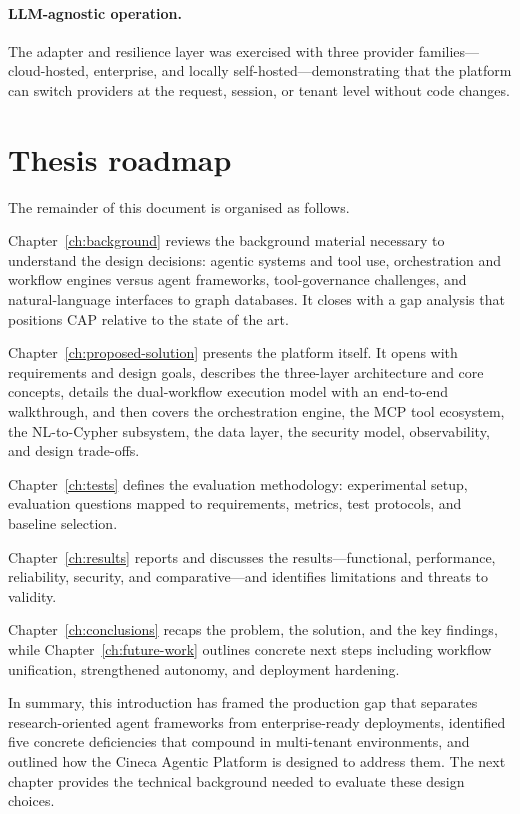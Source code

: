\documentclass[a4paper]{sapthesis}
\begin{document}
\paragraph{LLM-agnostic operation.}
The adapter and resilience layer was exercised with three provider
families---cloud-hosted, enterprise, and locally self-hosted---demonstrating
that the platform can switch providers at the request, session, or tenant
level without code changes.

\section{Thesis roadmap}
\label{sec:thesis-roadmap}

The remainder of this document is organised as follows.

Chapter~\ref{ch:background} reviews the background material necessary to
understand the design decisions: agentic systems and tool use, orchestration
and workflow engines versus agent frameworks, tool-governance challenges,
and natural-language interfaces to graph databases.  It closes with a gap
analysis that positions CAP relative to the state of the art.

Chapter~\ref{ch:proposed-solution} presents the platform itself.  It opens
with requirements and design goals, describes the three-layer architecture
and core concepts, details the dual-workflow execution model with an
end-to-end walkthrough, and then covers the orchestration engine, the MCP
tool ecosystem, the NL-to-Cypher subsystem, the data layer, the security
model, observability, and design trade-offs.

Chapter~\ref{ch:tests} defines the evaluation methodology: experimental
setup, evaluation questions mapped to requirements, metrics, test protocols,
and baseline selection.

Chapter~\ref{ch:results} reports and discusses the results---functional,
performance, reliability, security, and comparative---and identifies
limitations and threats to validity.

Chapter~\ref{ch:conclusions} recaps the problem, the solution, and the
key findings, while Chapter~\ref{ch:future-work} outlines concrete next
steps including workflow unification, strengthened autonomy, and
deployment hardening.

\medskip
\noindent
In summary, this introduction has framed the production gap that separates
research-oriented agent frameworks from enterprise-ready deployments,
identified five concrete deficiencies that compound in multi-tenant
environments, and outlined how the Cineca Agentic Platform is designed to
address them.  The next chapter provides the technical background needed to
evaluate these design choices.
\end{document}
